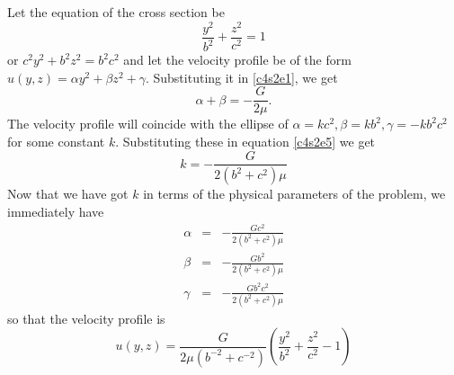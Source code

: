 \begin{itemize}
Let the equation of the cross section be
\[
\frac{y^2}{b^2} + \frac{z^2}{c^2} = 1 
\]
or $c^2y^2 + b^2z^2 = b^2c^2$ and let the velocity profile be of the form $u(y, z) =\alpha y^2 + \beta z^2 + 
\gamma$. Substituting it in
\eqref{c4s2e1}, we get
\begin{equation}\label{c4s2e5}
\alpha + \beta = -\frac{G}{2\mu}.
\end{equation}
The velocity profile will coincide with the ellipse of $\alpha = kc^2, \beta = kb^2, \gamma = -kb^2c^2$ for some
constant $k$. Substituting these in equation \eqref{c4s2e5} we get
\begin{equation}\label{c4s2e6}
k = -\frac{G}{2(b^2 + c^2)\mu}
\end{equation}
Now that we have got $k$ in terms of the physical parameters of the problem, we immediately have
\begin{eqnarray*}
\alpha &=& -\frac{Gc^2}{2(b^2 + c^2)\mu} \\
\beta  &=& -\frac{Gb^2}{2(b^2 + c^2)\mu} \\
\gamma &=& -\frac{Gb^2c^2}{2(b^2 + c^2)\mu}
\end{eqnarray*}
so that the velocity profile is 
\begin{equation}\label{c4s2e7}
u(y, z) = \frac{G}{2\mu(b^{-2} + c^{-2})}\left(\frac{y^2}{b^2} + \frac{z^2}{c^2} - 1\right)
\end{equation}


\end{itemize}
